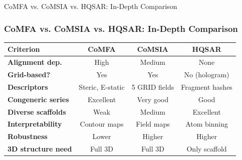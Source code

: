 \documentclass[aspectratio=169,11pt]{beamer}
\begin{document}
\begin{frame}{CoMFA vs. CoMSIA vs. HQSAR: In-Depth Comparison}
  \frametitle[CoMFA vs. CoMSIA vs. HQSAR]{CoMFA vs. CoMSIA vs. HQSAR: In-Depth Comparison}
  \begin{tabular}{|l|ccc|}
    \hline
    \textbf{Criterion} & \textbf{CoMFA} & \textbf{CoMSIA} & \textbf{HQSAR} \\
    \hline
    \textbf{Alignment dep.} & High & Medium & None \\
    \textbf{Grid-based?} & Yes & Yes & No (hologram) \\
    \textbf{Descriptors} & Steric, E-static & 5 GRID fields & Fragment hashes \\
    \textbf{Congeneric series} & Excellent & Very good & Good \\
    \textbf{Diverse scaffolds} & Weak & Medium & Excellent \\
    \textbf{Interpretability} & Contour maps & Field maps & Atom binning \\
    \textbf{Robustness} & Lower & Higher & Higher \\
    \textbf{3D structure need} & Full 3D & Full 3D & Only scaffold \\
    \hline
  \end{tabular}

  \iqbsep

\end{frame}
\end{document}
